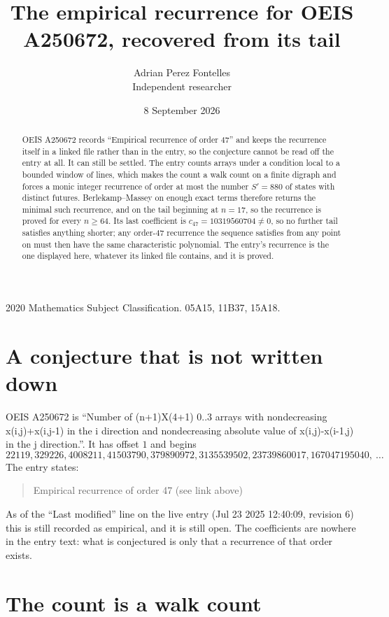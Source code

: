 \documentclass[11pt,a4paper]{article}
\title{The empirical recurrence for OEIS A250672, recovered from its tail}
\author{Adrian Perez Fontelles\\ \small Independent researcher}
\date{8 September 2026}
\theoremstyle{plain}
\theoremstyle{definition}
\begin{document}
\maketitle

\begin{abstract}
OEIS A250672 records ``Empirical recurrence of order $47$'' and keeps the recurrence itself in
a linked file rather than in the entry, so the conjecture cannot be read off the entry at all.
It can still be settled. The entry counts arrays under a condition local to a bounded window of
lines, which makes the count a walk count on a finite digraph and forces a monic integer
recurrence of order at most the number $S'=880$ of states with distinct futures. Berlekamp--Massey on
enough exact terms therefore returns the minimal such recurrence, and on the tail beginning at $n=17$, so the recurrence is proved for every $n\ge64$.
Its last coefficient is $c_{47}=10319560704\neq0$, so no further tail satisfies anything
shorter; any order-$47$ recurrence the sequence satisfies from any point on must then have
the same characteristic polynomial. The entry's recurrence is the one displayed here, whatever
its linked file contains, and it is proved.
\end{abstract}

\noindent\small 2020 Mathematics Subject Classification. 05A15, 11B37, 15A18.\normalsize

\section{A conjecture that is not written down}

OEIS A250672 is ``Number of (n+1)X(4+1) 0..3 arrays with nondecreasing x(i,j)+x(i,j-1) in the i direction and nondecreasing absolute value of x(i,j)-x(i-1,j) in the j direction.''. It has offset $1$ and begins
\[
22119, 329226, 4008211, 41503790, 379890972, 3135539502, 23739860017, 167047195040,\ \dots
\]
The entry states:
\begin{quote}
Empirical recurrence of order 47 (see link above)
\end{quote}
As of the ``Last modified'' line on the live entry (Jul 23 2025 12:40:09, revision 6)
this is still recorded as empirical, and it is still open. The coefficients are nowhere in the
entry text: what is conjectured is only that a recurrence of that order exists.

\section{The count is a walk count}
\end{document}
